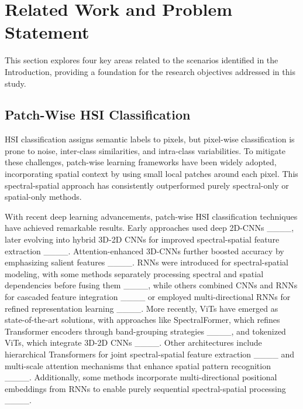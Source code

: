 \section{Related Work and Problem Statement}
\label{related_work}
This section explores four key areas related to the scenarios identified in the Introduction, providing a foundation for the research objectives addressed in this study.
\subsection{Patch-Wise HSI Classification}
HSI classification assigns semantic labels to pixels, but pixel-wise classification is prone to noise, inter-class similarities, and intra-class variabilities. To mitigate these challenges, patch-wise learning frameworks have been widely adopted, incorporating spatial context by using small local patches around each pixel. This spectral-spatial approach has consistently outperformed purely spectral-only or spatial-only methods.

With recent deep learning advancements, patch-wise HSI classification techniques have achieved remarkable results. Early approaches used deep 2D-CNNs ____, later evolving into hybrid 3D-2D CNNs for improved spectral-spatial feature extraction ____. Attention-enhanced 3D-CNNs further boosted accuracy by emphasizing salient features ____. RNNs were introduced for spectral-spatial modeling, with some methods separately processing spectral and spatial dependencies before fusing them ____, while others combined CNNs and RNNs for cascaded feature integration ____ or employed multi-directional RNNs for refined representation learning ____. More recently, ViTs have emerged as state-of-the-art solutions, with approaches like SpectralFormer, which refines Transformer encoders through band-grouping strategies ____, and tokenized ViTs, which integrate 3D-2D CNNs ____. Other architectures include hierarchical Transformers for joint spectral-spatial feature extraction ____ and multi-scale attention mechanisms that enhance spatial pattern recognition ____. Additionally, some methods incorporate multi-directional positional embeddings from RNNs to enable purely sequential spectral-spatial processing ____.


